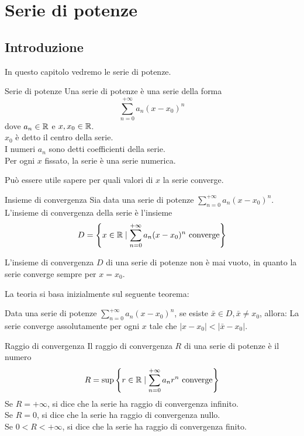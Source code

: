 
\chapter{Serie di potenze}
\section{Introduzione}
In questo capitolo vedremo le serie di potenze.
\begin{definizione}{Serie di potenze}
    Una serie di potenze è una serie della forma
    \[
        \sum_{n=0}^{+\infty} a_n (x-x_0)^n
    \]
    dove $a_n \in \mathbb{R}$ e $x,x_0 \in \mathbb{R}$.\\
    $x_0$ è detto il centro della serie.\\
    I numeri $a_n$ sono detti coefficienti della serie.\\
    Per ogni $x$ fissato, la serie è una serie numerica.
\end{definizione}

Può essere utile sapere per quali valori di $x$ la serie converge.\\

\begin{definizione}{Insieme di convergenza}
    Sia data una serie di potenze $\sum_{n=0}^{+\infty} a_n (x-x_0)^n$.\\
    L'insieme di convergenza della serie è l'insieme
    \[
        D=\left\{ x \in \mathbb{R} \mid \sum_{n=0}^{+\infty} a_n (x-x_0)^n \text{ converge} \right\}
    \]
\end{definizione}

\begin{osservazione}
    L'insieme di convergenza $D$ di una serie di potenze non è mai vuoto, in quanto la serie converge sempre per $x=x_0$.
\end{osservazione}


La teoria si basa inizialmente sul seguente teorema:
\begin{teorema}{}
  Data una serie di potenze $\sum_{n=0}^{+\infty} a_n (x-x_0)^n$, se esiste $\bar{x} \in D, \bar{x}\neq x_0$, allora:
  La serie converge assolutamente per ogni $x$ tale che $\lvert x - x_0 \rvert < \lvert \bar{x} - x_0 \rvert$.\\
\end{teorema}

\begin{definizione}{Raggio di convergenza}
  Il raggio di convergenza $R$ di una serie di potenze è il numero
  \[
      R = \sup \left\{ r \in \mathbb{R} \mid \sum_{n=0}^{+\infty} a_n r^n \text{ converge} \right\}
  \]
  Se $R = +\infty$, si dice che la serie ha raggio di convergenza infinito.\\
  Se $R = 0$, si dice che la serie ha raggio di convergenza nullo.\\
  Se $0 < R < +\infty$, si dice che la serie ha raggio di convergenza finito.
\end{definizione}

